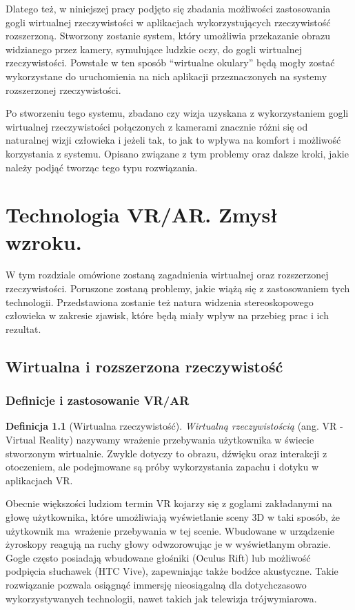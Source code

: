 \documentclass[a4paper,11pt,twoside]{report}
\theoremstyle{definition}
\newtheorem{definition}[theorem]{Definicja}
\begin{document}
Dlatego też, w niniejszej pracy podjęto się zbadania możliwości zastosowania gogli wirtualnej rzeczywistości w aplikacjach wykorzystujących rzeczywistość rozszerzoną. Stworzony zostanie system, który umożliwia przekazanie obrazu widzianego przez kamery, symulujące ludzkie oczy, do gogli wirtualnej rzeczywistości. Powstałe w ten sposób ``wirtualne okulary'' będą mogły zostać wykorzystane do uruchomienia na nich aplikacji przeznaczonych na systemy rozszerzonej rzeczywistości.

Po stworzeniu tego systemu, zbadano czy wizja uzyskana z wykorzystaniem gogli wirtualnej rzeczywistości połączonych z kamerami znacznie różni się od naturalnej wizji człowieka i jeżeli tak, to jak to wpływa na komfort i możliwość korzystania z systemu. Opisano związane z tym problemy oraz dalsze kroki, jakie należy podjąć tworząc tego typu rozwiązania.

\chapter{Technologia VR/AR. Zmysł wzroku.}

W tym rozdziale omówione zostaną zagadnienia wirtualnej oraz rozszerzonej rzeczywistości. Poruszone zostaną problemy, jakie wiążą się z zastosowaniem tych technologii. Przedstawiona zostanie też natura widzenia stereoskopowego człowieka w zakresie zjawisk, które będą miały wpływ na przebieg prac i ich rezultat.

\section{Wirtualna i rozszerzona rzeczywistość}

\subsection{Definicje i zastosowanie VR/AR}

\begin{definition}[Wirtualna rzeczywistość]
\textit{Wirtualną rzeczywistością} (ang. VR - Virtual Reality) nazywamy wrażenie przebywania użytkownika w świecie stworzonym wirtualnie. Zwykle dotyczy to obrazu, dźwięku oraz interakcji z otoczeniem, ale podejmowane są próby wykorzystania zapachu i dotyku w aplikacjach VR.
\end{definition}

Obecnie większości ludziom termin VR kojarzy się z goglami zakładanymi na głowę użytkownika, które umożliwiają wyświetlanie sceny 3D w taki sposób, że użytkownik ma~wrażenie przebywania w tej scenie. Wbudowane w urządzenie żyroskopy reagują na ruchy głowy odwzorowując je w wyświetlanym obrazie. Gogle często posiadają wbudowane głośniki (Oculus Rift) lub możliwość podpięcia słuchawek (HTC Vive), zapewniając także bodźce akustyczne. Takie rozwiązanie pozwala osiągnąć immersję nieosiągalną dla dotychczasowo wykorzystywanych technologii, nawet takich jak telewizja trójwymiarowa.
\end{document}
